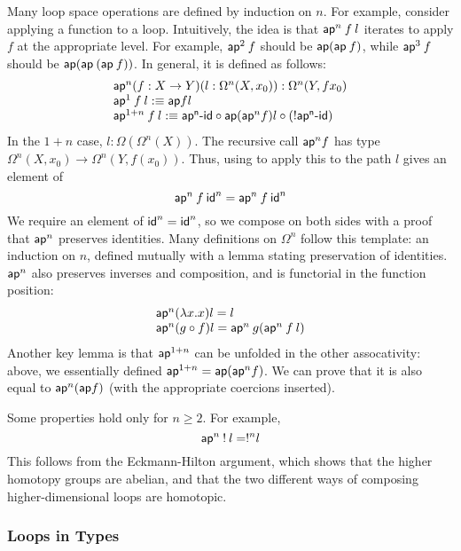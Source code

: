 Many loop space operations are  defined by induction on $n$.  For
example, consider applying a function to a loop.  Intuitively, the idea
is that $\mathsf{ap}^n \: f \: l$ iterates  to apply $f$ at the
appropriate level.  For example, $\mathsf{ap}^2 \: f$ should be $\mathsf{ap}
(\mathsf{ap} \: f)$, while $\mathsf{ap}^3 \: f$ should be $\mathsf{ap}
(\mathsf{ap} \: (\mathsf{ap} \: f))$.  In general, it is defined as follows:
\[
\begin{array}{l}
\mathsf{ap}^n (f : X \to Y) (l : \Omega^n(X,x_0)) : \Omega^n(Y,f x_0) \\
\mathsf{ap}^1 \: f \: l :\equiv \mathsf{ap} f l \\
\mathsf{ap}^{1+n} \: f \: l :\equiv \mathsf{ap^n\text{-}id } \mathbin{\circ} \mathsf{ap} (\mathsf{ap}^n f) l \mathbin{\circ} (! \mathsf{ap^n\text{-}id }) \\
\end{array}
\]
In the $1+n$ case, $l : \Omega(\Omega^n(X))$.  The recursive call
$\mathsf{ap}^n f$ has type $\Omega^n(X,x_0) \to \Omega^n(Y, f(x_0))$.  Thus, 
using  to apply this to the path $l$ gives an element of 
\[
\mathsf{ap}^n \: f \: \mathsf{id}^n = \mathsf{ap}^n \: f \: \mathsf{id}^n
\]
We require an element of $\mathsf{id}^{n} = \mathsf{id}^n$, so we compose on
both sides with a proof  that $\mathsf{ap}^n$
preserves identities.  Many definitions on $\Omega^n$ follow this
template: an induction on $n$, defined mutually with a lemma stating
preservation of identities.  $\mathsf{ap}^n$ also preserves inverses and
composition, and is functorial in the function position:
\[
\begin{array}{l}
\mathsf{ap}^n(\lambda x.x) l = l \\
\mathsf{ap}^n(g \mathbin{\circ} f) l = \mathsf{ap}^n \: g (\mathsf{ap}^n \: f \: l) 
\end{array}
\]
Another key lemma is that $\mathsf{ap}^{1+n}$ can be unfolded in the other
assocativity: above, we essentially defined $\mathsf{ap}^{1+n} =
\mathsf{ap}(\mathsf{ap}^n f)$.  We can prove that it is also equal to $\mathsf{ap}^n(\mathsf{ap}
f)$ (with the appropriate  coercions inserted).   

Some properties hold only for $n\ge2$.  For example, 
\[
\mathsf{ap}^n \: ! \: l = !^n l 
\]
This follows from the Eckmann-Hilton argument, which shows that the
higher homotopy groups are abelian, and that the two different ways of
composing higher-dimensional loops are homotopic.  

\subsubsection{Loops in Types}

